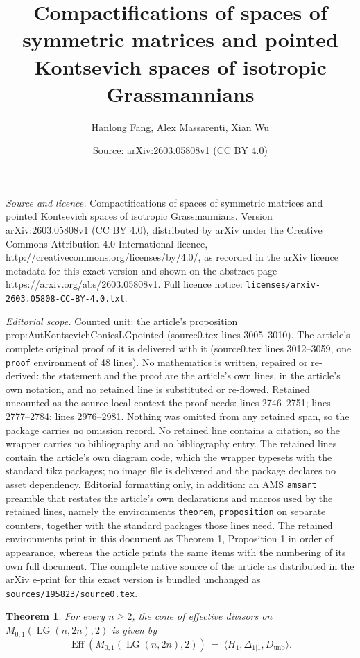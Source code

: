 \documentclass[10pt,a4paper]{amsart}
\title{Compactifications of spaces of symmetric matrices and pointed Kontsevich spaces of isotropic Grassmannians}
\author{Hanlong Fang, Alex Massarenti, Xian Wu}
\date{Source: arXiv:2603.05808v1 (CC BY 4.0)}
\newtheorem{theorem}{Theorem}
\newcommand{\LG}{\operatorname{LG}}
\DeclareMathOperator{\unb}{unb}
\begin{document}
\maketitle

\noindent\emph{Source and licence.} Compactifications of spaces of symmetric matrices and pointed Kontsevich spaces of isotropic Grassmannians. Version arXiv:2603.05808v1 (CC BY 4.0), distributed by arXiv under the Creative Commons Attribution 4.0 International licence, http://creativecommons.org/licenses/by/4.0/, as recorded in the arXiv licence metadata for this exact version and shown on the abstract page https://arxiv.org/abs/2603.05808v1. Full licence notice: \texttt{licenses/arxiv-2603.05808-CC-BY-4.0.txt}.\par\smallskip

\noindent\textit{Editorial scope.} Counted unit: the article's proposition prop:AutKontsevichConicsLGpointed (source0.tex lines 3005--3010). The article's complete original proof of it is delivered with it (source0.tex lines 3012--3059, one \texttt{proof} environment of 48 lines). No mathematics is written, repaired or re-derived: the statement and the proof are the article's own lines, in the article's own notation, and no retained line is substituted or re-flowed.  Retained uncounted as the source-local context the proof needs: lines 2746--2751; lines 2777--2784; lines 2976--2981.  Nothing was omitted from any retained span, so the package carries no omission record.  No retained line contains a citation, so the wrapper carries no bibliography and no bibliography entry.  The retained lines contain the article's own diagram code, which the wrapper typesets with the standard tikz packages; no image file is delivered and the package declares no asset dependency.  Editorial formatting only, in addition: an AMS \texttt{amsart} preamble that restates the article's own declarations and macros used by the retained lines, namely the environments \texttt{theorem}, \texttt{proposition} on separate counters, together with the standard packages those lines need.  The retained environments print in this document as Theorem 1, Proposition 1 in order of appearance, whereas the article prints the same items with the numbering of its own full document.  The complete native source of the article as distributed in the arXiv e-print for this exact version is bundled unchanged as \texttt{sources/195823/source0.tex}.
\begin{theorem}\label{thm:Eff-general-n-k1}
For every $n\ge 2$, the cone of effective divisors on $\overline{M}_{0,1}(\LG(n,2n),2)$ is given by
\[
\operatorname{Eff}(\overline{M}_{0,1}(\LG(n,2n),2))\ =\ \bigl\langle H_1, \Delta_{1|1}, D_{\unb}\bigr\rangle.
\]
\end{theorem}
\end{document}

